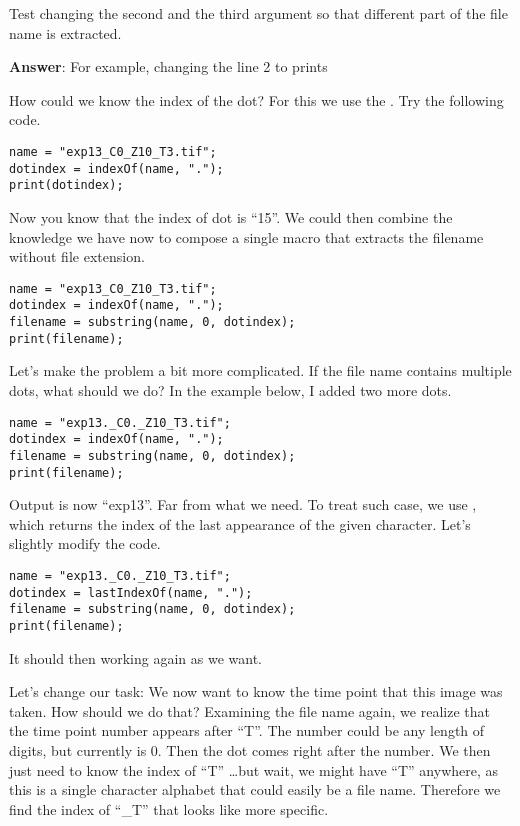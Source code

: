 \begin{indentexercise}{1}
	\item Test changing the second and the third argument so that different part of the file name is extracted.
	\item \textbf{Answer}: For example, changing the line 2 to  prints \ilcom{13\textunderscore}
\end{indentexercise}

How could we know the index of the dot? For this we use the . Try the following code. 

\begin{lstlisting}
name = "exp13_C0_Z10_T3.tif";
dotindex = indexOf(name, ".");
print(dotindex);
\end{lstlisting}

Now you know that the index of dot is ``15''. We could then combine the knowledge we have now to compose a single macro that extracts the filename without file extension. 

\begin{lstlisting}
name = "exp13_C0_Z10_T3.tif";
dotindex = indexOf(name, ".");
filename = substring(name, 0, dotindex);
print(filename);
\end{lstlisting}

Let's make the problem a bit more complicated. If the file name contains multiple dots, what should we do? In the example below, I added two more dots. 

\begin{lstlisting}
name = "exp13._C0._Z10_T3.tif";
dotindex = indexOf(name, ".");
filename = substring(name, 0, dotindex);
print(filename);
\end{lstlisting}

Output is now ``exp13''. Far from what we need. To treat such case, we use , which returns the index of the last appearance of the given character. Let's slightly modify the code. 

\begin{lstlisting}
name = "exp13._C0._Z10_T3.tif";
dotindex = lastIndexOf(name, ".");
filename = substring(name, 0, dotindex);
print(filename);
\end{lstlisting}

It should then working again as we want. 

Let's change our task: We now want to know the time point that this image was taken. How should we do that? Examining the file name again, we realize that the time point number appears after ``T''. The number could be any length of digits, but currently is 0. Then the dot comes right after the number. We then just need to know the index of ``T'' \ldots but wait, we might have ``T'' anywhere, as this is a single character alphabet that could easily be a file name. Therefore we find the index of ``\_T'' that looks like more specific. 

